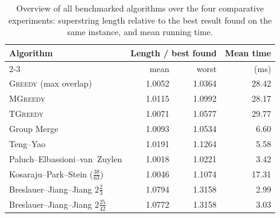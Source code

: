 \begin{table}[htbp]
    \centering
    \caption{Overview of all benchmarked algorithms over the four comparative experiments: superstring length relative to the best result found on the same instance, and mean running time.}
    \label{tab:bench_overview}
    \small
    \setlength{\tabcolsep}{7pt}
    \renewcommand{\arraystretch}{1.1}
    \begin{tabular}{@{}lrrr@{}}
        \toprule
        \textbf{Algorithm} & \multicolumn{2}{c}{\textbf{Length / best found}} & \textbf{Mean time} \\
        \cmidrule(lr){2-3}
         & mean & worst & (ms) \\
        \midrule
        \textsc{Greedy} (max overlap) & 1.0052 & 1.0364 & 28.42 \\
        \textsc{MGreedy} & 1.0115 & 1.0992 & 28.17 \\
        \textsc{TGreedy} & 1.0071 & 1.0577 & 29.77 \\
        Group Merge & 1.0093 & 1.0534 & 6.60 \\
        Teng--Yao & 1.0191 & 1.1264 & 5.58 \\
        Paluch--Elbassioni--van~Zuylen & 1.0018 & 1.0221 & 3.42 \\
        Kosaraju--Park--Stein ($\frac{38}{63}$) & 1.0046 & 1.1074 & 17.31 \\
        Breslauer--Jiang--Jiang $2\frac{2}{3}$ & 1.0794 & 1.3158 & 2.99 \\
        Breslauer--Jiang--Jiang $2\frac{25}{42}$ & 1.0772 & 1.3158 & 3.03 \\
        \bottomrule
    \end{tabular}
\end{table}
